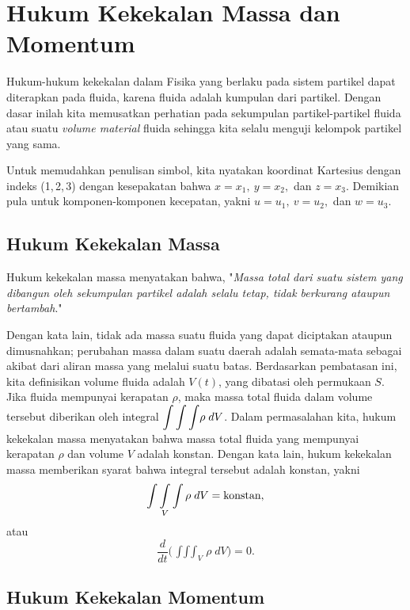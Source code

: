 \documentclass[12pt,a4paper]{report}
\begin{document}
\section{Hukum Kekekalan Massa dan Momentum}

Hukum-hukum kekekalan dalam Fisika yang berlaku pada sistem partikel dapat
diterapkan pada fluida, karena fluida adalah kumpulan dari partikel. Dengan
dasar inilah kita memusatkan perhatian pada sekumpulan partikel-partikel
fluida atau suatu \textit{volume material} fluida sehingga kita selalu
menguji kelompok partikel yang sama.

Untuk memudahkan penulisan simbol, kita nyatakan koordinat Kartesius dengan
indeks (1,\,2,\,3) dengan kesepakatan bahwa $x=x_{1},\: y=x_{2},$ dan $%
z=x_{3}.$ Demikian pula untuk komponen-komponen kecepatan, yakni $u=u_{1},\:
v=u_{2},$ dan $w=u_{3}.$

\subsection{Hukum Kekekalan Massa}

Hukum kekekalan massa menyatakan bahwa, "\textit{Massa total dari suatu
sistem yang dibangun oleh sekumpulan partikel adalah selalu tetap, tidak
berkurang ataupun bertambah}."

Dengan kata lain, tidak ada massa suatu fluida yang dapat diciptakan ataupun
dimusnahkan; perubahan massa dalam suatu daerah adalah semata-mata sebagai
akibat dari aliran massa yang melalui suatu batas. Berdasarkan pembatasan
ini, kita definisikan volume fluida adalah $V(t)$, yang dibatasi oleh
permukaan $S$. Jika fluida mempunyai kerapatan $\rho$, maka massa total
fluida dalam volume tersebut diberikan oleh integral $\displaystyle{%
\int\int\int} \rho \;dV $. Dalam permasalahan kita, hukum kekekalan massa
menyatakan bahwa massa total fluida yang mempunyai kerapatan $\rho$ dan
volume $V$ adalah konstan. Dengan kata lain, hukum kekekalan massa
memberikan syarat bahwa integral tersebut adalah konstan, yakni
\begin{equation}
\mathop{\int\int\int}_{V} \rho \; dV = \textmd{konstan},
\end{equation}
atau
\begin{equation}
\frac{d}{dt}\Bigg(\mathop {\int\int\int}_{V} \rho \; dV \Bigg)= 0.
\label{ms}
\end{equation}

\subsection{Hukum Kekekalan Momentum}
\end{document}
